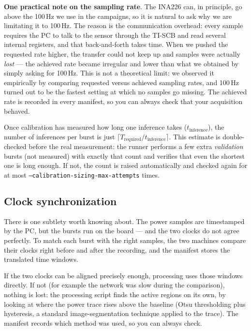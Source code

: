 \textbf{One practical note on the sampling rate}. The INA226 can, in principle, go
above the 100\,Hz we use in the campaigns, so it is natural to ask why
we are limitating it to 100\,Hz. The reason is the communication overhead: every sample
requires the PC to talk to the sensor through the TI-SCB and read several
internal registers, and that back-and-forth takes time. When we pushed the
requested rate higher, the transfer could not keep up and samples were
actually \emph{lost} --- the achieved rate became irregular and lower than
what we obtained by simply asking for 100\,Hz. This is not a theoretical
limit: we observed it empirically by comparing requested versus achieved
sampling rates, and 100\,Hz turned out to be the fastest setting at which
no samples go missing. The achieved rate is recorded in every manifest, so
you can always check that your acquisition behaved.

Once calibration has measured how long one inference takes
($t_{\text{inference}}$), the number of inferences per burst is just
$\lceil T_{\text{required}} / t_{\text{inference}} \rceil$. This estimate is
double-checked before the real measurement: the runner performs a few extra
\emph{validation} bursts (not measured) with exactly that count and verifies
that even the shortest one is long enough. If not, the count is raised
automatically and checked again for at most \texttt{--calibration-sizing-max-attempts} times.

\subsection{Clock synchronization}

There is one subtlety worth knowing about. The power samples are timestamped
by the PC, but the bursts run on the board --- and the two clocks do not
agree perfectly. To match each burst with the right samples, the two
machines compare their clocks right before and after the recording, and the
manifest stores the translated time windows.

If the two clocks can be aligned precisely enough, processing uses those
windows directly. If not (for example the network was slow during the
comparison), nothing is lost: the processing script finds the active regions
on its own, by looking at where the power trace rises above the baseline
(Otsu thresholding plus hysteresis, a standard image-segmentation technique
applied to the trace). The manifest records which method was used, so you
can always check.

